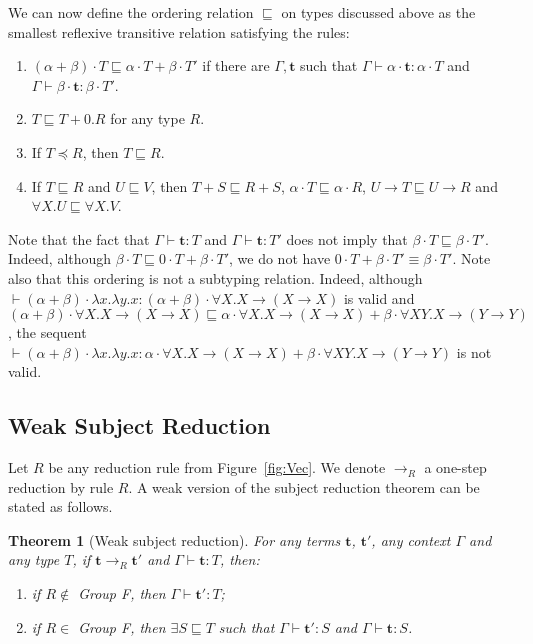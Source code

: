 \documentclass[colorlinks=true,linkcolor=black,urlcolor=black,citecolor=blue,submission,copyright,creativecommons]{eptcs}
\newtheorem{theorem}{Theorem}[section]
\newcommand{\ve}[1]{\mathrm{\textbf{#1}}}
\newcommand{\type}{\colon\!}
\begin{document}
We can now define the ordering relation $\sqsubseteq$ on types
discussed above as the
smallest reflexive transitive relation satisfying the rules:
\begin{enumerate}
 \item $(\alpha+\beta)\cdot T\sqsubseteq\alpha\cdot T+\beta\cdot T'$
   if there are $\Gamma,\ve{t}$ such that $\Gamma\vdash\alpha\cdot \ve{t}\type \alpha\cdot T$ and $\Gamma\vdash\beta\cdot \ve{t}\type \beta\cdot T'$.
\item $T\sqsubseteq T+0.R$ for any type $R$.
\item If $T\preceq R$, then $T\sqsubseteq R$.
\item If $T\sqsubseteq R$ and $U\sqsubseteq V$, then $T+S\sqsubseteq
  R+S$,  $\alpha\cdot T\sqsubseteq\alpha\cdot R$, $U\to T\sqsubseteq
  U\to R$ and $\forall X.U\sqsubseteq\forall X.V$.
\end{enumerate}
Note that the fact that $\Gamma\vdash \ve t\type T$ and $\Gamma\vdash
\ve t\type T'$ does not imply that $\beta\cdot T\sqsubseteq
\beta\cdot T'$. Indeed, although $\beta\cdot T\sqsubseteq 0\cdot
T+\beta\cdot T'$, we do not have $0\cdot T+\beta\cdot
T'\equiv\beta\cdot T'$.
Note also that this ordering is not a subtyping relation. Indeed,
although $\vdash (\alpha+\beta)\cdot \lambda x.\lambda
y.x:(\alpha+\beta)\cdot \forall X.X\to (X\to X)$ is valid and
$(\alpha+\beta)\cdot \forall X.X\to (X\to X)\sqsubseteq \alpha\cdot
\forall X.X\to (X\to X)+\beta\cdot\forall XY.X\to(Y\to Y)$, the
sequent $\vdash (\alpha+\beta)\cdot \lambda x.\lambda y.x:\alpha\cdot \forall
X.X\to (X\to X)+\beta\cdot\forall XY.X\to(Y\to Y)$ is not valid.


\subsection{Weak Subject Reduction}
Let $R$ be any reduction rule from Figure~\ref{fig:Vec}. We denote $\to_R$ a one-step reduction by rule $R$.
A weak version of the subject reduction theorem can be stated as follows.
\begin{theorem}[Weak subject reduction]\label{thm:subjectreduction}
  For any terms $\ve t$, $\ve t'$, any context $\Gamma$ and any type
  $T$, if $\ve{t}\to_R\ve{t}'$ and $\Gamma\vdash \ve t\type T$, then:
  \begin{enumerate}
   \item if $R\notin$ Group F, then $\Gamma\vdash\ve t'\type T$;
   \item if $R\in$ Group F, then
   $\exists S\sqsubseteq T$ such that $\Gamma\vdash\ve t'\type S$ and
   $\Gamma\vdash\ve{t}\type S$.
  \end{enumerate}
\end{theorem}
\end{document}
